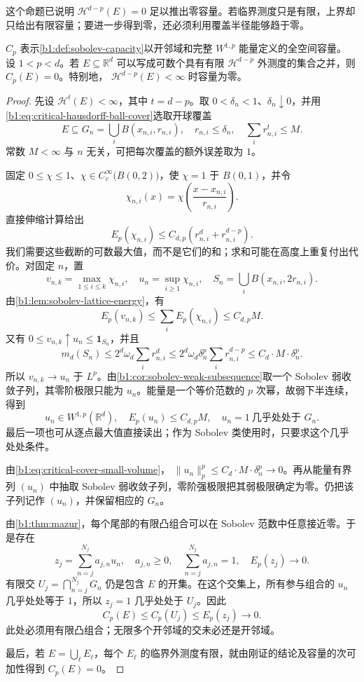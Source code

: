 这个命题已说明 \(\mathcal H^{d-p}(E)=0\) 足以推出零容量。若临界测度只是有限，上界却只给出有限容量；要进一步得到零，还必须利用覆盖半径能够趋于零。

\begin{theorem}\label{b1:thm:finite-critical-hausdorff-zero-capacity}
\(C_p\) 表示\cref{b1:def:sobolev-capacity}以开邻域和完整 \(W^{1,p}\) 能量定义的全空间容量。
设 \(1<p<d\)。若 \(E\subseteq\mathbb R^d\) 可以写成可数个具有有限
\(\mathcal H^{d-p}\) 外测度的集合之并，则 \(C_p(E)=0\)。特别地，
\(\mathcal H^{d-p}(E)<\infty\) 时容量为零。
\end{theorem}
\begin{proof}
先设 \(\mathcal H^t(E)<\infty\)，其中 \(t=d-p\)。取 \(0<\delta_n<1\)、\(\delta_n\downarrow0\)，并用\eqref{b1:eq:critical-hausdorff-ball-cover}选取开球覆盖
\[
 E\subseteq G_n=\bigcup_i B(x_{n,i},r_{n,i}),\quad
 r_{n,i}\leq\delta_n,\quad
 \sum_i r_{n,i}^t\leq M.
\]
常数 \(M<\infty\) 与 \(n\) 无关，可把每次覆盖的额外误差取为 \(1\)。

固定 \(0\leq\chi\leq1\)、\(\chi\in C_c^\infty\bigl(B(0,2)\bigr)\)，使 \(\chi=1\) 于 \(B(0,1)\)，并令
\[
 \chi_{n,i}(x)=\chi\left(\frac{x-x_{n,i}}{r_{n,i}}\right).
\]
直接伸缩计算给出
\[
 E_p(\chi_{n,i})
 \leq C_{d,p}(r_{n,i}^d+r_{n,i}^{d-p}).
\]
我们需要这些截断的可数最大值，而不是它们的和；求和可能在高度上重复付出代价。对固定 \(n\)，置
\[
 v_{n,k}=\max_{1\leq i\leq k}\chi_{n,i},\quad
 u_n=\sup_{i\geq1}\chi_{n,i},\quad
 S_n=\bigcup_i B(x_{n,i},2r_{n,i}).
\]
由\cref{b1:lem:sobolev-lattice-energy}，有
\[
 E_p(v_{n,k})\leq\sum_iE_p(\chi_{n,i})\leq C_{d,p}M.
\]
又有 \(0\leq v_{n,k}\uparrow u_n\leq\mathbf1_{S_n}\)，并且
\begin{equation}\label{b1:eq:critical-cover-small-volume}
 m_d(S_n)\leq2^d\omega_d\sum_i r_{n,i}^d
 \leq2^d\omega_d\delta_n^p\sum_i r_{n,i}^{d-p}
 \leq C_d\cdot M\cdot\delta_n^p.
\end{equation}
所以 \(v_{n,k}\to u_n\) 于 \(L^p\)。由\cref{b1:cor:sobolev-weak-subsequence}取一个 Sobolev 弱收敛子列，其零阶极限只能为 \(u_n\)。能量是一个等价范数的 \(p\) 次幂，故弱下半连续，得到
\[
 u_n\in W^{1,p}(\mathbb R^d),\quad
 E_p(u_n)\leq C_{d,p}M,\quad
 u_n=1\ \text{几乎处处于 }G_n.
\]
最后一项也可从逐点最大值直接读出；作为 Sobolev 类使用时，只要求这个几乎处处条件。

由\eqref{b1:eq:critical-cover-small-volume}，
\(\|u_n\|_p^p\leq C_d\cdot M\cdot\delta_n^p\to0\)。再从能量有界列
\((u_n)\) 中抽取 Sobolev 弱收敛子列，零阶强极限把其弱极限确定为零。仍把该子列记作 \((u_n)\)，并保留相应的 \(G_n\)。

由\cref{b1:thm:mazur}，每个尾部的有限凸组合可以在 Sobolev 范数中任意接近零。于是存在
\[
 z_j=\sum_{n=j}^{N_j}a_{j,n}u_n,\quad
 a_{j,n}\geq0,\quad \sum_{n=j}^{N_j}a_{j,n}=1,\quad
 E_p(z_j)\longrightarrow0.
\]
有限交 \(U_j=\bigcap_{n=j}^{N_j}G_n\) 仍是包含 \(E\) 的开集。在这个交集上，所有参与组合的 \(u_n\) 几乎处处等于 \(1\)，所以
\(z_j=1\) 几乎处处于 \(U_j\)。因此
\[
 C_p(E)\leq C_p(U_j)\leq E_p(z_j)\longrightarrow0.
\]
此处必须用有限凸组合；无限多个开邻域的交未必还是开邻域。

最后，若 \(E=\bigcup_\ell E_\ell\)，每个 \(E_\ell\) 的临界外测度有限，就由刚证的结论及容量的次可加性得到 \(C_p(E)=0\)。
\end{proof}

